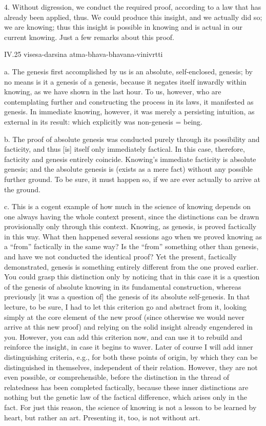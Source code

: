 4. Without digression, we conduct the required proof,
according to a law that has already been applied, thus.
We could produce this insight,
and we actually did so; we are knowing;
thus this insight is possible in knowing
and is actual in our current knowing.
Just a few remarks about this proof.

IV.25
visesa-darsina atma-bhava-bhavana-vinivrtti

a. The genesis first accomplished by us is
an absolute, self-enclosed, genesis;
by no means is it a genesis of a genesis,
because it negates itself inwardly within knowing,
as we have shown in the last hour.
To us, however, who are contemplating further
and constructing the process in its laws,
it manifested as genesis.
In immediate knowing, however,
it was merely a persisting intuition,
as external in its result:
which explicitly was non-genesis = being.

b. The proof of absolute genesis was conducted purely
through its possibility and facticity,
and thus [is] itself only immediately factical.
In this case, therefore, facticity and genesis entirely coincide.
Knowing's immediate facticity is absolute genesis;
and the absolute genesis is (exists as a mere fact)
without any possible further ground.
To be sure, it must happen so,
if we are ever actually to arrive at the ground.

c. This is a cogent example of how much
in the science of knowing depends on one
always having the whole context present,
since the distinctions can be drawn
provisionally only through this context.
Knowing, as genesis, is proved factically in this way.
What then happened several sessions ago when
we proved knowing as a “from” factically in the same way?
Is the “from” something other than genesis,
and have we not conducted the identical proof?
Yet the present, factically demonstrated, genesis is
something entirely different from the one proved earlier.
You could grasp this distinction only by
noticing that in this case it is a question of
the genesis of absolute knowing in its fundamental construction,
whereas previously [it was a question of] the
genesis of its absolute self-genesis.
In that lecture, to be sure, I had to let this
criterion go and abstract from it,
looking simply at the core element of the new proof
(since otherwise we would never arrive at this new proof)
and relying on the solid insight already engendered in you.
However, you can add this criterion now,
and can use it to rebuild and reinforce the insight,
in case it begins to waver.
Later of course I will add inner distinguishing criteria,
e.g., for both these points of origin,
by which they can be distinguished in themselves,
independent of their relation.
However, they are not even possible, or comprehensible,
before the distinction in the thread of relatedness
has been completed factically,
because these inner distinctions are nothing but
the genetic law of the factical difference,
which arises only in the fact.
For just this reason, the science of knowing is
not a lesson to be learned by heart,
but rather an art.
Presenting it, too, is not without art.

